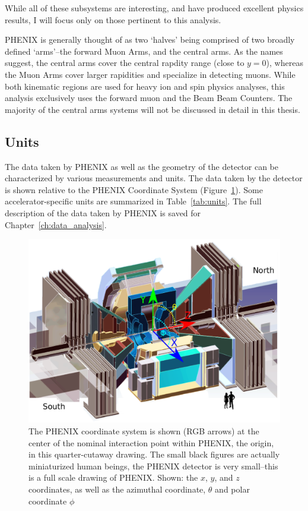 While all of these subsystems are interesting, and have produced excellent
physics results, I will focus only on those pertinent to this analysis.

PHENIX is generally thought of as two `halves' being comprised of two broadly
defined `arms'--the forward Muon Arms, and the central arms. As the names
suggest, the central arms cover the central rapdity range (close to $y=0$),
whereas the Muon Arms cover larger rapidities and specialize in detecting muons.
While both kinematic regions are used for heavy ion and spin physics analyses,
this analysis exclusively uses the forward muon and the Beam Beam Counters. The
majority of the central arms systems will not be discussed in detail in this
thesis.

\subsection{Units}

The data taken by PHENIX as well as the geometry of the detector can be
characterized by various measurements and units. The data taken by the detector
is shown relative to the PHENIX Coordinate System
(Figure~\ref{fig:phenix_coordinate_system}). Some accelerator-specific units are
summarized in Table~\ref{tab:units}. The full description of the data taken by
PHENIX is saved for Chapter~\ref{ch:data_analysis}.

\begin{figure}[ht]
  \centering
  \includegraphics[width=\linewidth]{./figures/phenix_coordinate_system.png}
  \caption{
    The PHENIX coordinate system is shown (RGB arrows) at the center of the
    nominal interaction point within PHENIX, the origin, in this quarter-cutaway
    drawing. The small black figures are actually miniaturized human beings, the
    PHENIX detector is very small--this is a full scale drawing of PHENIX.
    Shown: the $x$, $y$, and $z$ coordinates, as well as the azimuthal
    coordinate, $\theta$ and polar coordinate $\phi$ ~\cite{WebPHENIXDrawings}
  }
  \label{fig:phenix_coordinate_system}

\end{figure}


